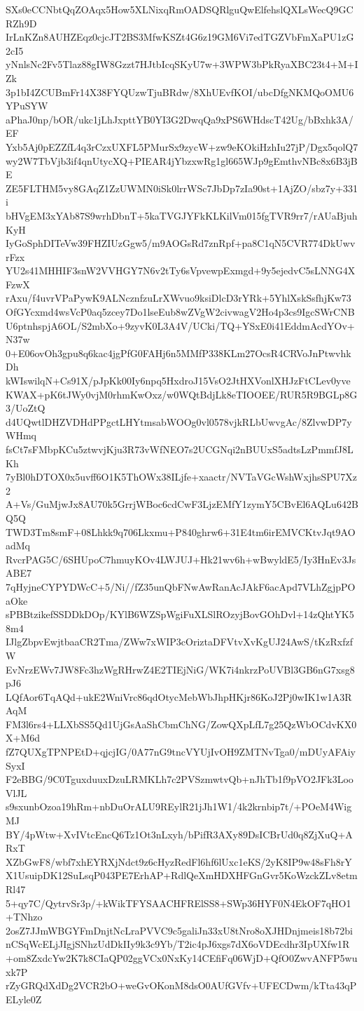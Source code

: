 SXs0eCCNbtQqZOAqx5How5XLNixqRmOADSQRlguQwElfehslQXLsWecQ9GCRZh9D
IrLnKZn8AUHZEqz0cjcJT2BS3MfwKSZt4G6z19GM6Vi7edTGZVbFmXaPU1zG2cI5
yNnlsNc2Fv5Tlaz88gIW8Gzzt7HJtbIcqSKyU7w+3WPW3bPkRyaXBC23t4+M+IZk
3p1bI4ZCUBmFr14X38FYQUzwTjuBRdw/8XhUEvfKOI/ubcDfgNKMQoOMU6YPuSYW
aPhaJ0np/bOR/ukc1jLhJxpttYB0YI3G2DwqQa9xPS6WHdscT42Ug/bBxhk3A/EF
Yxb5Aj0pEZZfL4q3rCzxUXFL5PMurSx9zycW+zw9eKOkiHzhIu27jP/Dgx5qolQ7
wy2W7TbVjb3if4qnUtycXQ+PIEAR4jYbzxwRg1gl665WJp9gEmthvNBc8x6B3jBE
ZE5FLTHM5vy8GAqZ1ZzUWMN0iSk0lrrWSc7JbDp7zIa90st+1AjZO/sbz7y+331i
bHVgEM3xYAb87S9wrhDbnT+5kaTVGJYFkKLKilVm015fgTVR9rr7/rAUaBjuhKyH
IyGoSphDITeVw39FHZIUzGgw5/m9AOGsRd7znRpf+pa8C1qN5CVR774DkUwvrFzx
YU2s41MHHIF3snW2VVHGY7N6v2tTy6sVpvewpExmgd+9y5ejedvC5sLNNG4XFzwX
rAxu/f4uvrVPaPywK9ALNcznfzuLrXWvuo9ksiDlcD3rYRk+5YhlXskSsfhjKw73
OfGYcxmd4wsVcP0aq5zcey7Do1lseEub8wZVgW2civwagV2Ho4p3cs9IgcSWrCNB
U6ptnhspjA6OL/S2mbXo+9zyvK0L3A4V/UCki/TQ+YSxE0i41EddmAcdYOv+N37w
0+E06ovOh3gpu8q6kac4jgPfG0FAHj6n5MMfP338KLm27OcsR4CRVoJnPtwvhkDh
kWIswilqN+Cs91X/pJpKk00Iy6npq5HxdroJ15VsO2JtHXVonlXHJzFtCLev0yve
KWAX+pK6tJWy0vjM0rhmKwOxz/w0WQtBdjLk8eTIOOEE/RUR5R9BGLp8G3/UoZtQ
d4UQwtlDHZVDHdPPgctLHYtmsabWOOg0vl0578vjkRLbUwvgAc/8ZlvwDP7yWHmq
fsCt7sFMbpKCu5ztwvjKju3R73vWfNEO7s2UCGNqi2nBUUxS5adtsLzPmmfJ8LKh
7yBl0hDTOX0x5uvff6O1K5ThOWx38ILjfe+xaactr/NVTaVGcWshWxjhsSPU7Xz2
A+Vs/GuMjwJx8AU70k5GrrjWBoc6cdCwF3LjzEMfY1zymY5CBvEl6AQLu642BQ5Q
TWD3Tm8smF+08Lhkk9q706Lkxmu+P840ghrw6+31E4tm6irEMVCKtvJqt9AOadMq
RvcrPAG5C/6SHUpoC7hmuyKOv4LWJUJ+Hk21wv6h+wBwyldE5/Iy3HnEv3JsABE7
7qHyjneCYPYDWcC+5/Ni//fZ35unQbFNwAwRanAcJAkF6acApd7VLhZgjpPOaOke
sPBBtzikefSSDDkDOp/KYlB6WZSpWgiFuXLSlROzyjBovGOhDvl+14zQhtYK58m4
IJlgZbpvEwjtbaaCR2Tma/ZWw7xWIP3cOriztaDFVtvXvKgUJ24AwS/tKzRxfzfW
EvNrzEWv7JW8Fc3hzWgRHrwZ4E2TIEjNiG/WK7i4nkrzPoUVBl3GB6nG7xsg8pJ6
LQfAor6TqAQd+ukE2WniVrc86qdOtycMebWbJhpHKjr86KoJ2Pj0wIK1w1A3RAqM
FM3l6rs4+LLXbSS5Qd1UjGsAaShCbmChNG/ZowQXpLfL7g25QzWbOCdvKX0X+M6d
fZ7QUXgTPNPEtD+qjcjIG/0A77nG9tncVYUjIvOH9ZMTNvTga0/mDUyAFAiySyxI
F2eBBG/9C0TguxduuxDzuLRMKLh7c2PVSzmwtvQb+nJhTb1f9pVO2JFk3LooVlJL
s9sxunbOzoa19hRm+nbDuOrALU9REylR21jJh1W1/4k2krnbip7t/+POeM4WigMJ
BY/4pWtw+XvIVtcEncQ6Tz1Ot3nLxyh/bPifR3AXy89DsICBrUd0q8ZjXuQ+ARxT
XZbGwF8/wbf7xhEYRXjNdct9z6cHyzRedFl6hf6lUxc1eKS/2yK8IP9w48sFh8rY
X1UsuipDK12SuLsqP043PE7ErhAP+RdlQeXmHDXHFGnGvr5KoWzckZLv8etmRl47
5+qy7C/QytrvSr3p/+kWikTFYSAACHFRElSS8+SWp36HYF0N4EkOF7qHO1+TNhzo
2osZ7JJmWBGYFmDnjtNcLraPVVC9c5galiJn33xU8tNro8oXJHDnjmeis18b72bi
nCSqWcELjJIgjSNhzUdDkIIy9k3c9Yb/T2ic4pJ6xgs7dX6oVDEcdhr3IpUXfw1R
+om8ZxdcYw2K7k8CIaQP02ggVCx0NxKy14CEfiFq06WjD+QfO0ZwvANFP5wuxk7P
rZyGRQdXdDg2VCR2bO+weGvOKonM8dsO0AUfGVfv+UFECDwm/kTta43qPELyle0Z
